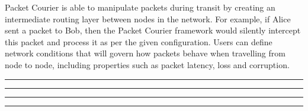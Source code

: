 Packet Courier is able to manipulate packets during transit by creating an intermediate routing layer between nodes
in the network. For example, if Alice sent a packet to Bob, then the Packet Courier framework would silently
intercept this packet and process it as per the given configuration. Users can define network conditions that will
govern how packets behave when travelling from node to node, including properties such as packet latency, loss and
corruption.


\vfill
\hrule\hrule\hrule\hrule
\clearpage
